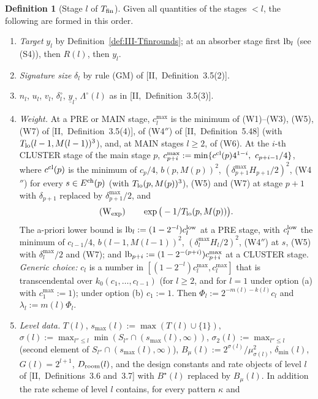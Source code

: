 \documentclass[10pt]{amsart}
\theoremstyle{definition}
\newtheorem{definition}[theorem]{Definition}
\theoremstyle{remark}
\begin{document}
\begin{definition}[Stage $l$ of $T_{\rm fin}$]\label{def:III-Tfinstage}
Given all quantities of the stages $<l$, the following are formed in this
order.
\begin{enumerate}
\item[(S1)] \emph{Target} $y_l$ by Definition~\ref{def:III-Tfinrounds}; at an
absorber stage first ${\rm lb}_l$ (see (S4)), then $R(l)$, then $y_l$.
\item[(S2)] \emph{Signature size} $\delta_l$ by rule (GM) of
[II,~Definition~3.5(2)].
\item[(S3)] $n_l$, $u_l$, $v_l$, $\delta^\circ_l$, $\underline y_l$,
$\Lambda^\circ(l)$ as in [II,~Definition~3.5(3)].
\item[(S4)] \emph{Weight.}  At a PRE or MAIN stage, $c^{\max}_l$ is the minimum
of (W1)--(W3), (W5), (W7) of [II,~Definition~3.5(4)], of (W4$''$) of
[II,~Definition~5.48] (with $T_{\rm lo}(l-1,M(l-1))^3$), and, at MAIN stages
$l\ge2$, of (W6).  At the $i$-th CLUSTER stage of the main stage $p$,
$c^{\max}_{p+i}:=\min\{c^{\rm cl}(p)4^{1-i},\ c_{p+i-1}/4\}$, where $c^{\rm cl}(p)$
is the minimum of $c_p/4$, $b(p,M(p))^2$, $(\delta^{\max}_{p+1}H_{p+1}/2)^2$,
(W4$''$) for every $s\in E^{\rm ch}(p)$ (with $T_{\rm lo}(p,M(p))^3$), (W5) and
(W7) at stage $p+1$ with $\delta_{p+1}$ replaced by $\delta^{\max}_{p+1}/2$,
and
\[
 \textup{(W$_{\exp}$)}\qquad \exp\big(-1/T_{\rm lo}(p,M(p))\big).
\]
The a-priori lower bound is ${\rm lb}_l:=(1-2^{-l})c^{\rm low}_l$ at a PRE stage,
with $c^{\rm low}_l$ the minimum of $c_{l-1}/4$, $b(l-1,M(l-1))^2$,
$(\delta^{\max}_lH_l/2)^2$, (W4$''$) at $s$, (W5) with $\delta^{\max}_l/2$ and
(W7); and ${\rm lb}_{p+i}:=(1-2^{-(p+i)})c^{\max}_{p+i}$ at a CLUSTER stage.
\emph{Generic choice:} $c_l$ is a number in $[(1-2^{-l})c^{\max}_l,c^{\max}_l]$
that is transcendental over $k_0(c_1,\dots,c_{l-1})$ (for $l\ge2$, and for
$l=1$ under option (a) with $c^{\max}_1:=1$); under option (b) $c_1:=1$.  Then
$\Phi_l:=2^{-m(l)-k(l)}c_l$ and $\lambda_l:=m(l)\Phi_l$.
\item[(S5)] \emph{Level data.}  $T(l)$, $s_{\max}(l):=\max(T(l)\cup\{1\})$,
$\sigma(l):=\max_{l''\le l}\min(S_{l''}\cap(s_{\max}(l),\infty))$, $\sigma_2(l):=
\max_{l''\le l}$ (second element of $S_{l''}\cap(s_{\max}(l),\infty)$),
$B_\mu(l):=2^{\sigma(l)}/\mu_{\sigma(l)}^2$, $\delta_{\min}(l)$, $G(l)=2^{l+1}$,
$D_{\rm room}(l)$, and the design constants and rate objects of level $l$ of
[II,~Definitions~3.6 and~3.7] with $B^\star(l)$ replaced by $B_\mu(l)$.  In
addition the rate scheme of level $l$ contains, for every pattern $\kappa$ and

\end{enumerate}
\end{definition}
\end{document}
